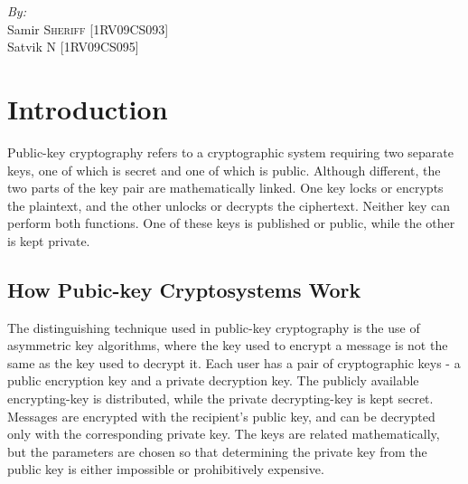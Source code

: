 \documentclass[12pt]{article} %
\begin{document}
\begin{titlepage}
\begin{center}
\begin{minipage}{0.8\textwidth}
\begin{flushleft} \large
\emph{By:}\\
Samir \textsc{Sheriff} [1RV09CS093]\\
Satvik \textsc{N} [1RV09CS095]\\


\end{flushleft}
\end{minipage}
\vfill

{\large}

\end{center}

\end{titlepage}



\maketitle
\setcounter{secnumdepth}{1}

\section{Introduction}
Public-key cryptography refers to a cryptographic system requiring two separate keys, one of which is secret and one of which is public. Although different, the two parts of the key pair are mathematically linked. One key locks or encrypts the plaintext, and the other unlocks or decrypts the ciphertext. Neither key can perform both functions. One of these keys is published or public, while the other is kept private.
\subsection{How Pubic-key Cryptosystems Work}
The distinguishing technique used in public-key cryptography is the use of asymmetric key algorithms, where the key used to encrypt a message is not the same as the key used to decrypt it. Each user has a pair of cryptographic keys - a public encryption key and a private decryption key. The publicly available encrypting-key is distributed, while the private decrypting-key is kept secret. Messages are encrypted with the recipient's public key, and can be decrypted only with the corresponding private key. The keys are related mathematically, but the parameters are chosen so that determining the private key from the public key is either impossible or prohibitively expensive. 
\end{document}
